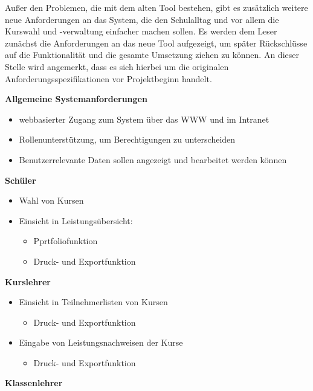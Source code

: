 Außer den Problemen, die mit dem alten Tool bestehen, gibt es zusätzlich weitere neue Anforderungen an das System, die den Schulalltag und vor allem die Kurswahl und -verwaltung einfacher machen sollen.
Es werden dem Leser zunächst die Anforderungen an das neue Tool aufgezeigt, um später Rückschlüsse auf die Funktionalität und die gesamte Umsetzung ziehen zu können.
An dieser Stelle wird angemerkt, dass es sich hierbei um die originalen Anforderungsspezifikationen vor Projektbeginn handelt.

\textbf{Allgemeine Systemanforderungen}

\begin{itemize}
  \item webbasierter Zugang zum System über das \ac{WWW} und im Intranet
  \item Rollenunterstützung, um Berechtigungen zu unterscheiden
  \item Benutzerrelevante Daten sollen angezeigt und bearbeitet werden können
\end{itemize}

\textbf{Schüler}

\begin{itemize}
  \item Wahl von Kursen
  \item Einsicht in Leistungsübersicht:
    \begin{itemize}
      \item Pprtfoliofunktion 
      \item Druck- und Exportfunktion
    \end{itemize}
\end{itemize}

\textbf{Kurslehrer}

\begin{itemize}
  \item Einsicht in Teilnehmerlisten von Kursen
  \begin{itemize}
    \item Druck- und Exportfunktion
  \end{itemize}
  \item Eingabe von Leistungsnachweisen der Kurse
  \begin{itemize}
    \item Druck- und Exportfunktion
  \end{itemize}
\end{itemize}

\textbf{Klassenlehrer}

